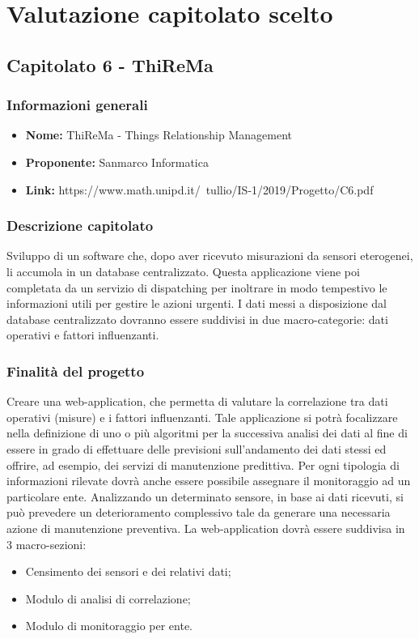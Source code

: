 \section{Valutazione capitolato scelto}
\subsection{Capitolato 6 - ThiReMa}

	\subsubsection{Informazioni generali}
		\begin{itemize}
			\item \textbf{Nome:} ThiReMa - Things Relationship Management
			\item \textbf{Proponente:} Sanmarco Informatica
			\item \textbf{Link:} https://www.math.unipd.it/~tullio/IS-1/2019/Progetto/C6.pdf
		\end{itemize}

	\subsubsection{Descrizione capitolato}
		Sviluppo di un software che,  dopo aver ricevuto misurazioni da sensori eterogenei, li accumola in un database centralizzato. Questa applicazione viene poi completata da un servizio di dispatching per inoltrare in modo tempestivo le informazioni utili per gestire le azioni urgenti.
		I dati messi a disposizione dal database centralizzato dovranno essere suddivisi in due macro-categorie: dati operativi e fattori influenzanti.

	\subsubsection{Finalità del progetto}
		Creare una web-application, che permetta di valutare la correlazione tra dati operativi (misure) e i fattori influenzanti. Tale applicazione si potrà focalizzare nella definizione di uno o più algoritmi per la successiva analisi dei dati al fine di essere in grado di effettuare delle previsioni sull’andamento dei dati stessi ed offrire, ad esempio, dei servizi di manutenzione predittiva.
		Per ogni tipologia di informazioni rilevate dovrà anche essere possibile assegnare il monitoraggio ad un particolare ente.
		Analizzando un determinato sensore, in base ai dati ricevuti, si può prevedere un deterioramento complessivo tale da generare una necessaria azione di manutenzione preventiva.
		La web-application dovrà essere suddivisa in 3 macro-sezioni:
			\begin{itemize}
				\item Censimento dei sensori e dei relativi dati;
				\item Modulo di analisi di correlazione;
				\item Modulo di monitoraggio per ente.
			\end{itemize}

